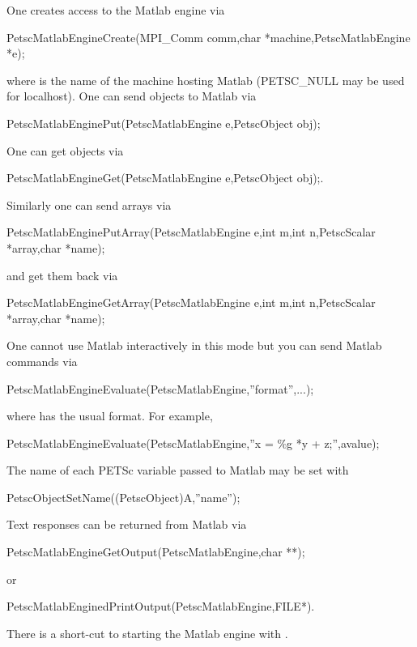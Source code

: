 One creates access to the Matlab engine via 
\begin{tabbing}
  PetscMatlabEngineCreate(MPI\_Comm comm,char *machine,PetscMatlabEngine *e);
\end{tabbing}
where  is the name of the machine hosting Matlab (PETSC_NULL may be used for localhost).
One can send objects to Matlab via 
\begin{tabbing}
  PetscMatlabEnginePut(PetscMatlabEngine e,PetscObject obj);
\end{tabbing}
One can get objects
via 
\begin{tabbing}
  PetscMatlabEngineGet(PetscMatlabEngine e,PetscObject obj);.
\end{tabbing}
Similarly one can send arrays via
\begin{tabbing}
  PetscMatlabEnginePutArray(PetscMatlabEngine e,int m,int n,PetscScalar *array,char *name);
\end{tabbing}
and get them back via
\begin{tabbing}
  PetscMatlabEngineGetArray(PetscMatlabEngine e,int m,int n,PetscScalar *array,char *name);
\end{tabbing}
One cannot use Matlab
interactively in this mode but you can send Matlab commands via
\begin{tabbing}
  PetscMatlabEngineEvaluate(PetscMatlabEngine,''format'',...);
\end{tabbing}
where  has the usual  format.
For example,
\begin{tabbing}
  PetscMatlabEngineEvaluate(PetscMatlabEngine,''x = \%g *y + z;'',avalue);
\end{tabbing}
The name of each PETSc variable passed to Matlab may be set with
\begin{tabbing}
PetscObjectSetName((PetscObject)A,''name'');
\end{tabbing}

Text responses can be returned from Matlab via 
\begin{tabbing}
  PetscMatlabEngineGetOutput(PetscMatlabEngine,char **); 
\end{tabbing}
or
\begin{tabbing}
PetscMatlabEnginedPrintOutput(PetscMatlabEngine,FILE*).
\end{tabbing}
There is a short-cut to starting the Matlab engine
with .




\cleardoublepage
